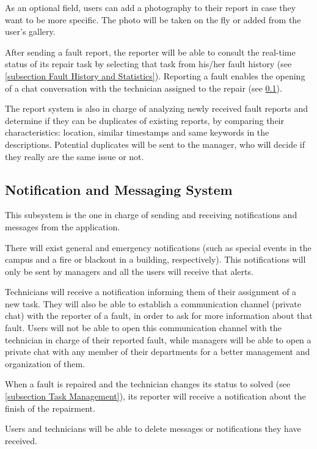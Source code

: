 As an optional field, users can add a photography to their report in case they want to be more specific. The photo will be taken on the fly or added from the user's gallery.

After sending a fault report, the reporter will be able to consult the real-time status of its repair task by selecting that task from his/her fault history (see \ref{subsection Fault History and Statistics}). Reporting a fault enables the opening of a chat conversation with the technician assigned to the repair (see \ref{subsection Notification and Messaging System}).

The report system is also in charge of analyzing newly received fault reports and determine if they can be duplicates of existing reports, by comparing their characteristics: location, similar timestamps and same keywords in the descriptions. Potential duplicates will be sent to the manager, who will decide if they really are the same issue or not.

\subsection{Notification and Messaging System}
\label{subsection Notification and Messaging System}
This subsystem is the one in charge of sending and receiving notifications and messages from the application.

There will exist general and emergency notifications (such as special events in the campus and a fire or blackout in a building, respectively). This notifications will only be sent by managers and all the users will receive that alerts.

Technicians will receive a notification informing them of their assignment of a new task. They will also be able to establish a communication channel (private chat) with the reporter of a fault, in order to ask for more information about that fault. Users will not be able to open this communication channel with the technician in charge of their reported fault, while managers will be able to open a private chat with any member of their departments for a better management and organization of them.

When a fault is repaired and the technician changes its status to solved (see \ref{subsection Task Management}), its reporter will receive a notification about the finish of the repairment.

Users and technicians will be able to delete messages or notifications they have received.

